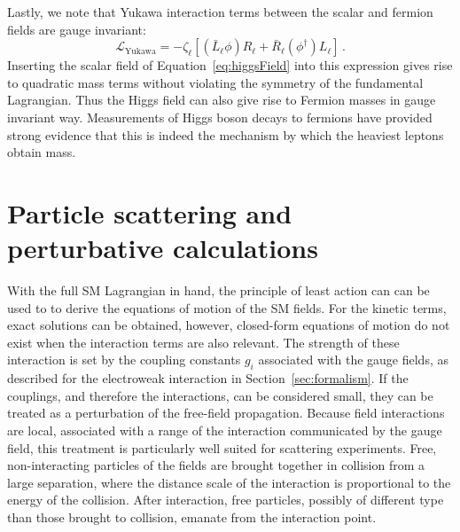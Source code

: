 Lastly, we note that Yukawa interaction terms between the scalar and fermion
fields are gauge invariant:
\begin{equation}
  \mathcal{L}_{\text{Yukawa}} = -\zeta_\ell[(\bar{L}_{\ell}\phi)R_{\ell} + \bar{R}_{\ell}(\phi^\dagger)L_{\ell}]\,.
\end{equation}
Inserting the scalar field of Equation~\ref{eq:higgsField} into this expression gives rise to quadratic mass terms
without violating the symmetry of the fundamental Lagrangian. Thus the Higgs field
can also give rise to Fermion masses in gauge invariant way. Measurements of Higgs boson decays to fermions
have provided strong evidence that this is indeed the mechanism by which the heaviest
leptons obtain mass. 

\section{Particle scattering and perturbative calculations}

With the full SM Lagrangian in hand, the principle of least action can
can be used to to derive the equations of motion of the SM fields. For the kinetic
terms, exact solutions can be obtained, however, closed-form equations of motion
do not exist when the interaction terms are also relevant.
The strength of these interaction is set by the coupling constants $g_i$
associated with the gauge fields, as described for the electroweak interaction
in Section~\ref{sec:formalism}. If the couplings, and therefore the interactions, can be 
considered small, they can be treated as a perturbation of the free-field
propagation. Because field interactions are local, associated with 
a range of the interaction communicated by the gauge field,
this treatment is particularly well suited for scattering experiments.
Free, non-interacting particles of the fields are brought together in collision 
from a large separation, where the distance scale of the interaction 
is proportional to the energy of the collision. After interaction,
free particles, possibly of different type than those brought to collision,
emanate from the interaction point.

